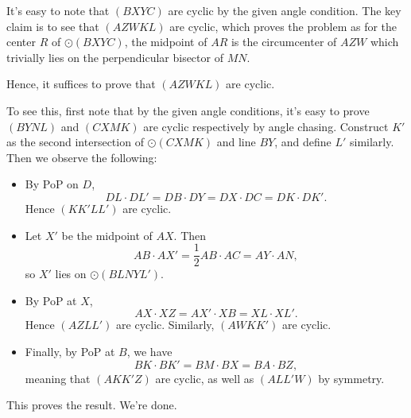 \documentclass[11pt]{article}
\begin{document}
\medskip
It's easy to note that $(BXYC)$ are cyclic by the given angle condition. The key claim is to see that $(AZWKL)$ are cyclic, which proves the problem as for the center $R$ of $\odot(BXYC)$, the midpoint of $AR$ is the circumcenter of $AZW$ which trivially lies on the perpendicular bisector of $MN$.

\medskip
Hence, it suffices to prove that $(AZWKL)$ are cyclic.

\medskip
To see this, first note that by the given angle conditions, it's easy to prove $(BYNL)$ and $(CXMK)$ are cyclic respectively by angle chasing. Construct $K'$ as the second intersection of $\odot(CXMK)$ and line $BY$, and define $L'$ similarly. Then we observe the following:
\begin{itemize}
    \item By PoP on $D$,$$DL \cdot DL' = DB \cdot DY = DX \cdot DC = DK \cdot DK'.$$Hence $(KK'LL')$ are cyclic.
    \item Let $X'$ be the midpoint of $AX$. Then$$AB \cdot AX' = \frac{1}{2} AB \cdot AC = AY \cdot AN,$$so $X'$ lies on $\odot (BLNYL')$.
    \item By PoP at $X$,$$AX \cdot XZ = AX' \cdot XB = XL \cdot XL'.$$Hence $(AZLL')$ are cyclic. Similarly, $(AWKK')$ are cyclic.
    \item Finally, by PoP at $B$, we have$$BK \cdot BK' = BM \cdot BX = BA \cdot BZ,$$meaning that $(AKK'Z)$ are cyclic, as well as $(ALL'W)$ by symmetry.
\end{itemize}
\noindent
This proves the result. We're done.
\newpage
\end{document}
